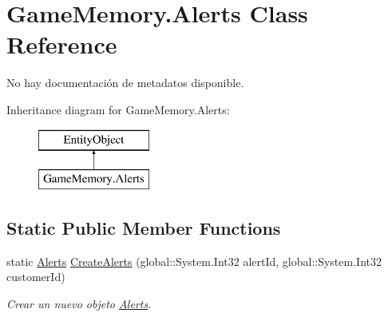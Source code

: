 \hypertarget{class_game_memory_1_1_alerts}{\section{Game\-Memory.\-Alerts Class Reference}
\label{class_game_memory_1_1_alerts}
}


No hay documentación de metadatos disponible.  


Inheritance diagram for Game\-Memory.\-Alerts\-:\begin{figure}[H]
\begin{center}
\leavevmode
\includegraphics[height=2.000000cm]{class_game_memory_1_1_alerts}
\end{center}
\end{figure}
\subsection*{Static Public Member Functions}
\begin{DoxyCompactItemize}
\item 
static \hyperlink{class_game_memory_1_1_alerts}{Alerts} \hyperlink{class_game_memory_1_1_alerts_a0ded6ee29a08738d78ef75d91c160920}{Create\-Alerts} (global\-::\-System.\-Int32 alert\-Id, global\-::\-System.\-Int32 customer\-Id)
\begin{DoxyCompactList}\small\item\em Crear un nuevo objeto \hyperlink{class_game_memory_1_1_alerts}{Alerts}. \end{DoxyCompactList}\end{DoxyCompactItemize}
